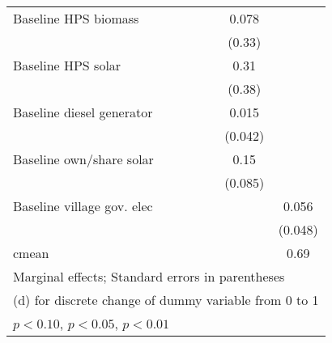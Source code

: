 \begin{table}[htbp]
\begin{tabular*}{1\hsize}{@{\hskip\tabcolsep\extracolsep\fill}l*{6}{c}}
Baseline HPS biomass&                  &                  &                  &                  &    0.078         &                  \\
                &                  &                  &                  &                  &   (0.33)         &                  \\
Baseline HPS solar&                  &                  &                  &                  &     0.31         &                  \\
                &                  &                  &                  &                  &   (0.38)         &                  \\
Baseline diesel generator&                  &                  &                  &                  &    0.015         &                  \\
                &                  &                  &                  &                  &  (0.042)         &                  \\
Baseline own/share solar&                  &                  &                  &                  &     0.15\sym{*}  &                  \\
                &                  &                  &                  &                  &  (0.085)         &                  \\
Baseline village gov. elec&                  &                  &                  &                  &                  &    0.056         \\
                &                  &                  &                  &                  &                  &  (0.048)         \\
\midrule
cmean           &                  &                  &                  &                  &                  &     0.69         \\
\bottomrule
\multicolumn{7}{l}{\footnotesize Marginal effects; Standard errors in parentheses}\\
\multicolumn{7}{l}{\footnotesize  (d) for discrete change of dummy variable from 0 to 1}\\
\multicolumn{7}{l}{\footnotesize \sym{*} \(p<0.10\), \sym{**} \(p<0.05\), \sym{***} \(p<0.01\)}\\
\end{tabular*}
\end{table}
